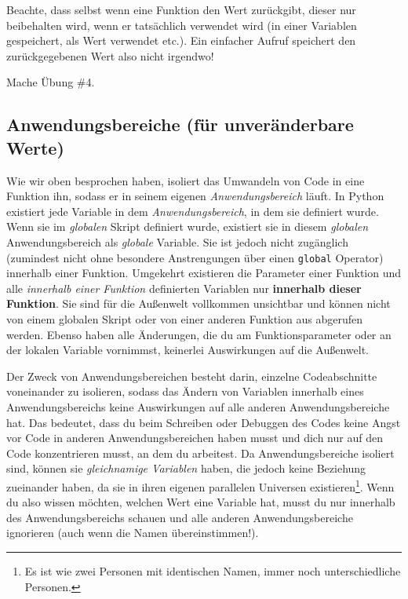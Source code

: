 \documentclass[
]{book}
\begin{document}
Beachte, dass selbst wenn eine Funktion den Wert zurückgibt, dieser nur beibehalten wird, wenn er tatsächlich verwendet wird (in einer Variablen gespeichert, als Wert verwendet etc.). Ein einfacher Aufruf speichert den zurückgegebenen Wert also nicht irgendwo!

Mache Übung \#4.

\hypertarget{anwendungsbereiche-fuxfcr-unveruxe4nderbare-werte}{%
\subsection{Anwendungsbereiche (für unveränderbare Werte)}\label{anwendungsbereiche-fuxfcr-unveruxe4nderbare-werte}}

Wie wir oben besprochen haben, isoliert das Umwandeln von Code in eine Funktion ihn, sodass er in seinem eigenen \emph{Anwendungsbereich} läuft. In Python existiert jede Variable in dem \emph{Anwendungsbereich}, in dem sie definiert wurde. Wenn sie im \emph{globalen} Skript definiert wurde, existiert sie in diesem \emph{globalen} Anwendungsbereich als \emph{globale} Variable. Sie ist jedoch nicht zugänglich (zumindest nicht ohne besondere Anstrengungen über einen \texttt{global} Operator) innerhalb einer Funktion. Umgekehrt existieren die Parameter einer Funktion und alle \emph{innerhalb einer Funktion} definierten Variablen nur \textbf{innerhalb dieser Funktion}. Sie sind für die Außenwelt vollkommen unsichtbar und können nicht von einem globalen Skript oder von einer anderen Funktion aus abgerufen werden. Ebenso haben alle Änderungen, die du am Funktionsparameter oder an der lokalen Variable vornimmst, keinerlei Auswirkungen auf die Außenwelt.

Der Zweck von Anwendungsbereichen besteht darin, einzelne Codeabschnitte voneinander zu isolieren, sodass das Ändern von Variablen innerhalb eines Anwendungsbereichs keine Auswirkungen auf alle anderen Anwendungsbereiche hat. Das bedeutet, dass du beim Schreiben oder Debuggen des Codes keine Angst vor Code in anderen Anwendungsbereichen haben musst und dich nur auf den Code konzentrieren musst, an dem du arbeitest. Da Anwendungsbereiche isoliert sind, können sie \emph{gleichnamige Variablen} haben, die jedoch keine Beziehung zueinander haben, da sie in ihren eigenen parallelen Universen existieren\footnote{Es ist wie zwei Personen mit identischen Namen, immer noch unterschiedliche Personen.}. Wenn du also wissen möchten, welchen Wert eine Variable hat, musst du nur innerhalb des Anwendungsbereichs schauen und alle anderen Anwendungsbereiche ignorieren (auch wenn die Namen übereinstimmen!).
\end{document}

